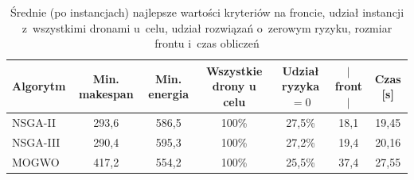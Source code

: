 \begin{table}[htbp]
    \centering
    \caption{Średnie (po instancjach) najlepsze wartości kryteriów na froncie, udział instancji z~wszystkimi dronami u~celu, udział rozwiązań o~zerowym ryzyku, rozmiar frontu i~czas obliczeń}
    \label{tab:objectives}
    \begin{tabular}{l c c c c c c}
        \hline
        Algorytm & Min. makespan & Min. energia & Wszystkie drony u celu & Udział ryzyka $= 0$ & $|$front$|$ & Czas [s] \\
        \hline
        NSGA-II & 293{,}6 & 586{,}5 & 100\% & 27{,}5\% & 18{,}1 & 19{,}45 \\
        NSGA-III & 290{,}4 & 595{,}3 & 100\% & 27{,}2\% & 19{,}4 & 20{,}16 \\
        MOGWO & 417{,}2 & 554{,}2 & 100\% & 25{,}5\% & 37{,}4 & 27{,}55 \\
        \hline
    \end{tabular}
\end{table}
